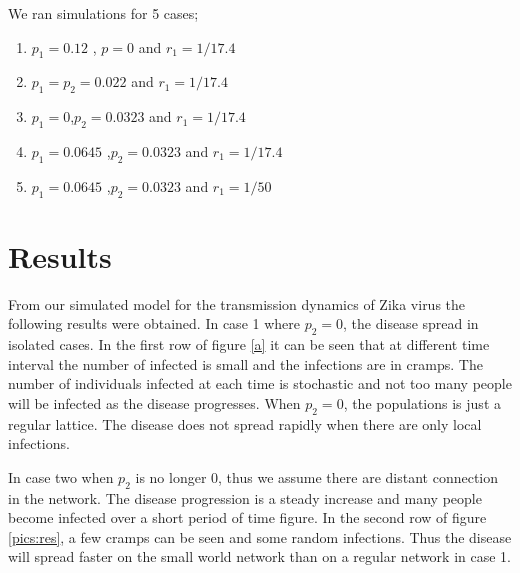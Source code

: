 We ran simulations for 5 cases;
\begin{enumerate}
\item $p_1 = 0.12$ , $p =0$ and $r_1 = 1/17.4$
\item $p_1 = p_2 = 0.022$ and $r_1 = 1/17.4$ 
\item $p_1 =0 $,$p_2 = 0.0323$ and $r_1 = 1/17.4$
\item $p_1 = 0.0645$ ,$p_2 = 0.0323$ and $r_1 = 1/17.4$
\item $p_1 = 0.0645$ ,$p_2 = 0.0323$ and $r_1 = 1/50$
\end{enumerate}

\section{Results}
From our simulated model for the transmission dynamics of Zika virus the following results were obtained. In case 1 where $p_2 =0$, the disease spread in isolated cases. In the first row of figure  \ref{a} it can be seen that at different time interval the number of infected is small and  the infections are in cramps.  The number of individuals infected at each time is stochastic and not too many people will be infected as the disease progresses.  When $p_2 = 0$, the populations is just a regular lattice. The disease does not spread rapidly when there are only local infections.

In case two when $p_2$ is no longer 0, thus we assume there are distant connection in the network. The disease progression is a steady increase and many people become infected over a short period of time figure. In the second row of figure \ref{pics:res}, a few cramps can be seen and some random infections.  Thus the disease will spread faster on the small world network than on a regular network in case 1.

